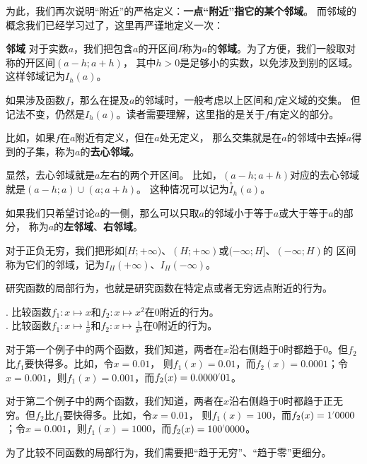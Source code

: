 \documentclass[12pt,UTF8]{ctexbook}
\begin{document}
为此，我们再次说明“附近”的严格定义：\textbf{一点“附近”指它的某个邻域}。
而邻域的概念我们已经学习过了，这里再严谨地定义一次：
\begin{df}{\textbf{邻域}}
    对于实数$a$，我们把包含$a$的开区间$I$称为$a$的\textbf{邻域}。为了方便，我们一般取对称的开区间$(a-h; a+h)$，
    其中$h>0$是足够小的实数，以免涉及到别的区域。这样邻域记为$I_h(a)$。

    如果涉及函数$f$，那么在提及$a$的邻域时，一般考虑以上区间和$f$定义域的交集。
    但记法不变，仍然是$I_h(a)$。读者需要理解，这里指的是关于$f$有定义的部分。

    比如，如果$f$在$a$附近有定义，但在$a$处无定义，
    那么交集就是在$a$的邻域中去掉$a$得到的子集，称为$a$的\textbf{去心邻域}。

    显然，去心邻域就是$a$左右的两个开区间。
    比如，$(a-h; a+h)$对应的去心邻域就是$(a-h; a)\cup(a; a+h)$。
    这种情况可以记为$\overset{\circ}{I}_h(a)$。

    如果我们只希望讨论$a$的一侧，那么可以只取$a$的邻域小于等于$a$或大于等于$a$的部分，
    称为$a$的\textbf{左邻域}、\textbf{右邻域}。

    对于正负无穷，我们把形如$[H; +\infty)$、$(H; +\infty)$或$(-\infty; H]$、$(-\infty; H)$的
    区间称为它们的邻域，记为$I_H(+\infty)$、$I_H(-\infty)$。
\end{df}

研究函数的局部行为，也就是研究函数在特定点或者无穷远点附近的行为。

\begin{ex}
    . 比较函数$f_1: x\mapsto x$和$f_2: x\mapsto x^2$在$0$附近的行为。\\
    . 比较函数$f_1: x\mapsto \frac{1}{x}$和$f_2: x\mapsto \frac{1}{x^2}$在$0$附近的行为。
\end{ex}

对于第一个例子中的两个函数，我们知道，两者在$x$沿右侧趋于$0$时都趋于$0$。但$f_2$比$f_1$要快得多。比如，令$x=0.01$，
则$f_1(x) = 0.01$，而$f_2(x) = 0.0001$；令$x=0.001$，则$f_1(x) = 0.001$，而$f_2(x) = 0.0000\dlim{01}$。

对于第二个例子中的两个函数，我们知道，两者在$x$沿右侧趋于$0$时都趋于正无穷。但$f_2$比$f_1$要快得多。比如，令$x=0.01$，
则$f_1(x) = 100$，而$f_2(x) = 1\dlim{0000}$；令$x=0.001$，则$f_1(x) = 1000$，而$f_2(x) = 100\dlim{0000}$。

为了比较不同函数的局部行为，我们需要把“趋于无穷”、“趋于零”更细分。
\end{document}
